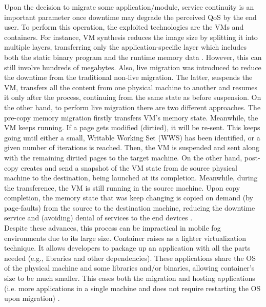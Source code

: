 \noindent\tab Upon the decision to migrate some application/module, service continuity is an important parameter once downtime may degrade the perceived QoS by the end user. To perform this operation, the exploited technologies are the VMs and containers. For instance, VM synthesis reduces the image size by splitting it into multiple layers, transferring only the application-specific layer which includes both the static binary program and the runtime memory data \cite{ma2017efficient}. However, this can still involve hundreds of megabytes. Also, live migration was introduced to reduce the downtime from the traditional non-live migration. The latter, suspends the VM, transfers all the content from one physical machine to another and resumes it only after the process, continuing from the same state as before suspension. On the other hand, to perform live migration there are two different approaches. The pre-copy memory migration firstly transfers VM’s memory state. Meanwhile, the VM keeps running. If a page gets modified (dirtied), it will be re-sent. This keeps going until either a small, Writable Working Set (WWS) has been identified, or a given number of iterations is reached. Then, the VM is suspended and sent along with the remaining dirtied pages to the target machine. On the other hand, post-copy creates and send a snapshot of the VM state from de source physical machine to the destination, being launched at its completion. Meanwhile, during the transference, the VM is still running in the source machine. Upon copy completion, the memory state that was keep changing is copied on demand (by page-faults) from the source to the destination machine, reducing the downtime service and (avoiding) denial of services to the end devices \cite{hines2009post}.\\
\noindent\tab Despite these advances, this process can be impractical in mobile fog environments due to its large size. Container raises as a lighter virtualization technique. It allows developers to package up an application with all the parts needed (e.g., libraries and other dependencies). These applications share the OS of the physical machine and some libraries and/or binaries, allowing container's size to be much smaller. This eases both the migration and hosting applications (i.e. more applications in a single machine and does not require restarting the OS upon migration) \cite{saurez2016incremental}.\\
